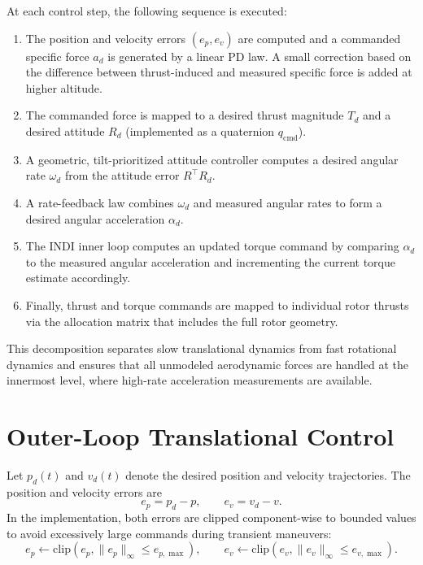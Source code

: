 At each control step, the following sequence is executed:
\begin{enumerate}
    \item The position and velocity errors $(e_p, e_v)$ are computed and a
          commanded specific force $a_d$ is generated by a linear PD law. A
          small correction based on the difference between thrust-induced and
          measured specific force is added at higher altitude.
    \item The commanded force is mapped to a desired thrust magnitude $T_d$ and
          a desired attitude $R_d$ (implemented as a quaternion $q_{\mathrm{cmd}}$).
    \item A geometric, tilt-prioritized attitude controller computes a desired
          angular rate $\omega_d$ from the attitude error $R^\top R_d$.
    \item A rate-feedback law combines $\omega_d$ and measured angular rates to
          form a desired angular acceleration $\alpha_d$.
    \item The INDI inner loop computes an updated torque command by comparing
          $\alpha_d$ to the measured angular acceleration and incrementing the
          current torque estimate accordingly.
    \item Finally, thrust and torque commands are mapped to individual rotor
          thrusts via the allocation matrix that includes the full rotor geometry.
\end{enumerate}

This decomposition separates slow translational dynamics from fast rotational
dynamics and ensures that all unmodeled aerodynamic forces are handled at the
innermost level, where high-rate acceleration measurements are available.

\section{Outer-Loop Translational Control}

Let $p_d(t)$ and $v_d(t)$ denote the desired position and velocity trajectories.
The position and velocity errors are
\begin{equation}
    e_p = p_d - p, \qquad
    e_v = v_d - v.
\end{equation}
In the implementation, both errors are clipped component-wise to bounded values
to avoid excessively large commands during transient maneuvers:
\begin{equation}
    e_p \leftarrow \mathrm{clip}(e_p, \|e_p\|_\infty \leq e_{p,\max}), \qquad
    e_v \leftarrow \mathrm{clip}(e_v, \|e_v\|_\infty \leq e_{v,\max}).
\end{equation}

